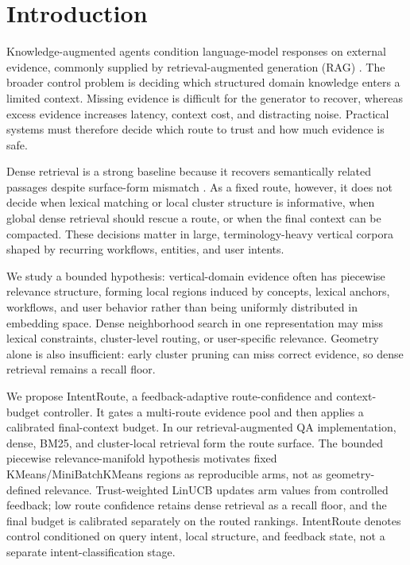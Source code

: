 
\section{Introduction}
\label{sec:02-introduction:introduction}

Knowledge-augmented agents condition language-model responses on external evidence, commonly supplied by retrieval-augmented generation (RAG) \citep{lewis2020rag}. The broader control problem is deciding which structured domain knowledge enters a limited context. Missing evidence is difficult for the generator to recover, whereas excess evidence increases latency, context cost, and distracting noise. Practical systems must therefore decide which route to trust and how much evidence is safe.

Dense retrieval is a strong baseline because it recovers semantically related passages despite surface-form mismatch \citep{karpukhin2020dpr}. As a fixed route, however, it does not decide when lexical matching or local cluster structure is informative, when global dense retrieval should rescue a route, or when the final context can be compacted. These decisions matter in large, terminology-heavy vertical corpora shaped by recurring workflows, entities, and user intents.

We study a bounded hypothesis: vertical-domain evidence often has piecewise relevance structure, forming local regions induced by concepts, lexical anchors, workflows, and user behavior rather than being uniformly distributed in embedding space. Dense neighborhood search in one representation may miss lexical constraints, cluster-level routing, or user-specific relevance. Geometry alone is also insufficient: early cluster pruning can miss correct evidence, so dense retrieval remains a recall floor.

We propose IntentRoute, a feedback-adaptive route-confidence and context-budget controller. It gates a multi-route evidence pool and then applies a calibrated final-context budget. In our retrieval-augmented QA implementation, dense, BM25, and cluster-local retrieval form the route surface. The bounded piecewise relevance-manifold hypothesis motivates fixed KMeans/MiniBatchKMeans regions as reproducible arms, not as geometry-defined relevance. Trust-weighted LinUCB updates arm values from controlled feedback; low route confidence retains dense retrieval as a recall floor, and the final budget is calibrated separately on the routed rankings. IntentRoute denotes control conditioned on query intent, local structure, and feedback state, not a separate intent-classification stage.

